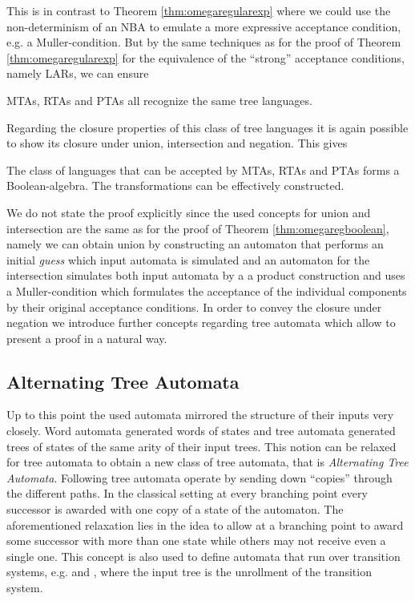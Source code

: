This is in contrast to Theorem \ref{thm:omegaregularexp} where we could use the
non-determinism of an \ac{NBA} to emulate a more expressive acceptance 
condition, e.g. a Muller-condition. But by the same techniques as for the proof 
of Theorem \ref{thm:omegaregularexp} for the equivalence of the 
\enquote{strong} acceptance conditions, namely \acp{LAR}, we can ensure
\begin{theorem}
  \cite[Theorem 8.7]{AutoLogInfGames}
  \acp{MTA}, \acp{RTA} and \acp{PTA} all recognize the same tree languages.
  \label{thm:treeautoequiv}
\end{theorem}
Regarding the closure properties of this class of tree languages it is again
possible to show its closure under union, intersection and negation. This gives
\begin{theorem}
  \cite[Theorem 1.3]{SOTheoAndTrees}
  \cite[Theorem 1.5]{SOTheoAndTrees}
  The class of languages that can be accepted by \acp{MTA}, \acp{RTA} and 
  \acp{PTA} forms a Boolean-algebra. The transformations can be effectively
  constructed.
  \label{thm:treeautoboolean}
\end{theorem}
We do not state the proof explicitly since the used concepts for union and
intersection are the same as for the proof of Theorem 
\ref{thm:omegaregboolean}, namely we can obtain union by constructing an 
automaton that performs an initial \emph{guess} which input automata is 
simulated and an automaton for the intersection simulates both input automata 
by a a product construction and uses a Muller-condition which formulates the 
acceptance of the individual components by their original acceptance 
conditions. In order to convey the closure under negation we introduce further 
concepts regarding tree automata which allow to present a proof in a natural 
way.

\subsection{Alternating Tree Automata}
\label{subsec:ata}
Up to this point the used automata mirrored the structure of their inputs
very closely. Word automata generated words of states and tree automata 
generated trees of states of the same arity of their input trees. This notion 
can be relaxed for tree automata to obtain a new class of tree
automata, that is \emph{Alternating Tree Automata}. Following 
\cite{AltTreeAuto} tree automata operate by sending down \enquote{copies} 
through the different paths. In the classical setting at every branching point 
every successor is awarded with one copy of a state of the automaton. The 
aforementioned relaxation lies in the idea to allow at a branching point to 
award some successor with more than one state while others may not receive even 
a single one. This concept is also used to define automata that run over 
transition systems, e.g. \cite[Chapter 9]{AutoLogInfGames} and 
\cite{SynProbEnv}, where the input tree is the unrollment of the transition 
system.

